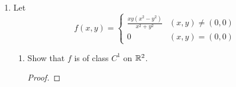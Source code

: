 \documentclass[../psets.tex]{subfiles}
\begin{document}
\begin{enumerate}
\begin{proof}
        To prove that $f$ is continuous at $\vec{a}$, it will suffice to show that $f(\vec{a}+\vec{h})-f(\vec{a})\to 0$ as $\vec{h}\to\bm{0}$. We have
        \begin{equation*}
            \begin{split}
                f(\vec{a}+\vec{h})-f(\vec{a}) ={}& f(a_1+h_1,a_2+h_2,a_3+h_3,\dots,a_n+h_n)-f(a_1,a_2+h_2,a_3+h_3,\dots,a_n+h_n)\\
                &+ f(a_1,a_2+h_2,a_3+h_3,\dots,a_n+h_n)-f(a_1,a_2,a_3+h_3,\dots,a_n+h_n)\\
                &+ \cdots\\
                &+ f(a_1,\dots,a_{n-1},a_n+h_n)-f(\vec{a})
            \end{split}
        \end{equation*}
        Applying the MVT to each term yields
        \begin{equation*}
            f(a_1,\dots,a_i+h_i,\dots,a_n+h_n)-f(a_1,\dots,a_i,\dots,a_n+h_n) = h_i{\pdv{f}{x_i}}(a_1,\dots,c_i(\vec{h}),\dots,a_n+h_n)
        \end{equation*}
        for some $c_i(\vec{h})\in(a_i,a_i+h_i)\cup(a_i+h_i,a_i)$. It follows that
        \begin{equation*}
            f(\vec{a}+\vec{h})-f(\vec{a}) = \sum_{i=1}^nh_i{\pdv{f}{x_i}}(a_1,\dots,c_i(\vec{h}),\dots,a_n+h_n)
        \end{equation*}
        But since the partial derivatives are bounded and the $h_i$'s are decreasing, each term in the summation goes to zero as $\vec{h}\to\bm{0}$, yielding the desired result.
    \end{proof}
    \item Let
    \begin{equation*}
        f(x,y) =
        \begin{cases}
            \frac{xy(x^2-y^2)}{x^2+y^2} & (x,y)\neq(0,0)\\
            0 & (x,y)=(0,0)
        \end{cases}
    \end{equation*}
    \begin{enumerate}
        \item Show that $f$ is of class $C^1$ on $\mathbb{R}^2$.
        \begin{proof}



\end{proof}
\end{enumerate}
\end{enumerate}
\end{document}
